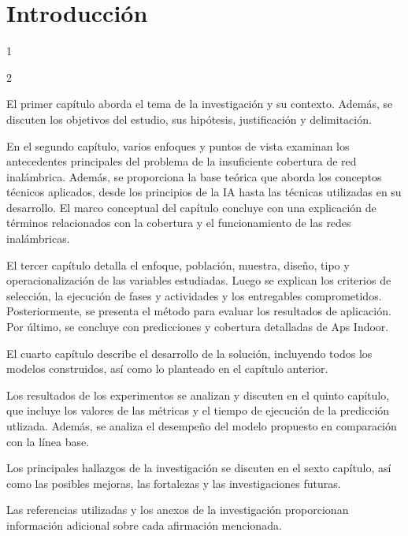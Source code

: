 
\chapter*{Introducción}

1

2

El primer capítulo aborda el tema de la investigación y su contexto. Además, se discuten los objetivos del estudio, sus hipótesis, justificación y delimitación.

En el segundo capítulo, varios enfoques y puntos de vista examinan los antecedentes principales del problema de la insuficiente cobertura de red inalámbrica. Además, se proporciona la base teórica que aborda los conceptos técnicos aplicados, desde los principios de la IA hasta las técnicas utilizadas en su desarrollo. El marco conceptual del capítulo concluye con una explicación de términos relacionados con la cobertura y el funcionamiento de las redes inalámbricas.

El tercer capítulo detalla el enfoque, población, muestra, diseño, tipo y operacionalización de las variables estudiadas. Luego se explican los criterios de selección, la ejecución de fases y actividades y los entregables comprometidos. Posteriormente, se presenta el método para evaluar los resultados de aplicación. Por último, se concluye con predicciones y cobertura detalladas de Aps Indoor.

El cuarto capítulo describe el desarrollo de la solución, incluyendo todos los modelos construidos, así como lo planteado en el capítulo anterior.

Los resultados de los experimentos se analizan y discuten en el quinto capítulo, que incluye los valores de las métricas y el tiempo de ejecución de la predicción utlizada. Además, se analiza el desempeño del modelo propuesto en comparación con la línea base.

Los principales hallazgos de la investigación se discuten en el sexto capítulo, así como las posibles mejoras, las fortalezas y las investigaciones futuras.

Las referencias utilizadas y los anexos de la investigación proporcionan información adicional sobre cada afirmación mencionada.